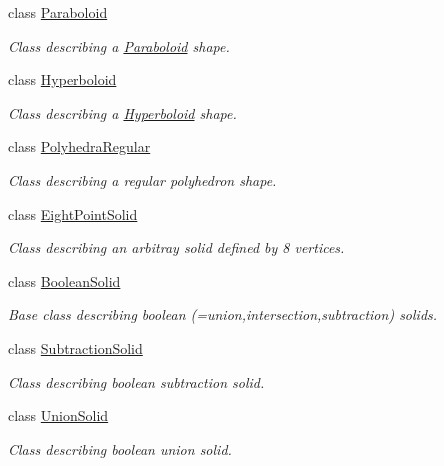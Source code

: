 \begin{DoxyCompactItemize}
class \hyperlink{class_d_d4hep_1_1_geometry_1_1_paraboloid}{Paraboloid}
\begin{DoxyCompactList}\small\item\em Class describing a \hyperlink{class_d_d4hep_1_1_geometry_1_1_paraboloid}{Paraboloid} shape. \item\end{DoxyCompactList}\item 
class \hyperlink{class_d_d4hep_1_1_geometry_1_1_hyperboloid}{Hyperboloid}
\begin{DoxyCompactList}\small\item\em Class describing a \hyperlink{class_d_d4hep_1_1_geometry_1_1_hyperboloid}{Hyperboloid} shape. \item\end{DoxyCompactList}\item 
class \hyperlink{class_d_d4hep_1_1_geometry_1_1_polyhedra_regular}{PolyhedraRegular}
\begin{DoxyCompactList}\small\item\em Class describing a regular polyhedron shape. \item\end{DoxyCompactList}\item 
class \hyperlink{class_d_d4hep_1_1_geometry_1_1_eight_point_solid}{EightPointSolid}
\begin{DoxyCompactList}\small\item\em Class describing an arbitray solid defined by 8 vertices. \item\end{DoxyCompactList}\item 
class \hyperlink{class_d_d4hep_1_1_geometry_1_1_boolean_solid}{BooleanSolid}
\begin{DoxyCompactList}\small\item\em Base class describing boolean (=union,intersection,subtraction) solids. \item\end{DoxyCompactList}\item 
class \hyperlink{class_d_d4hep_1_1_geometry_1_1_subtraction_solid}{SubtractionSolid}
\begin{DoxyCompactList}\small\item\em Class describing boolean subtraction solid. \item\end{DoxyCompactList}\item 
class \hyperlink{class_d_d4hep_1_1_geometry_1_1_union_solid}{UnionSolid}
\begin{DoxyCompactList}\small\item\em Class describing boolean union solid. \item\end{DoxyCompactList}\item 

\end{DoxyCompactItemize}
